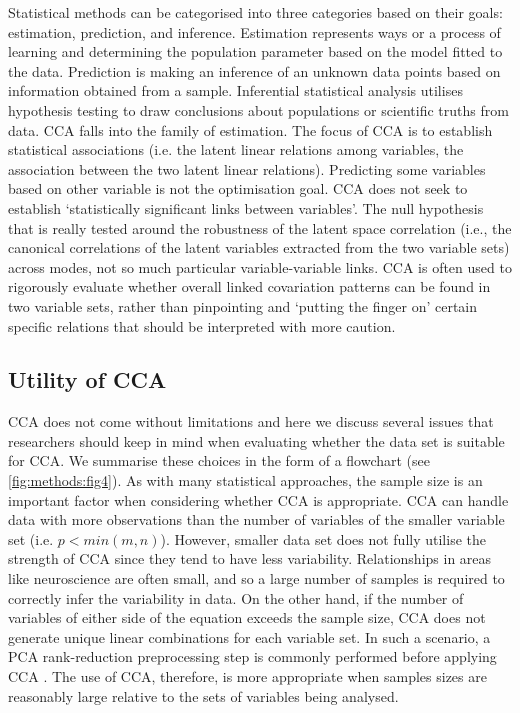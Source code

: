 Statistical methods can be categorised into three categories based on their goals: estimation, prediction, and inference.  Estimation represents ways or a process of learning and determining the population parameter based on the model fitted to the data. Prediction is making an inference of an unknown data points based on information obtained from a sample. Inferential statistical analysis utilises hypothesis testing to draw conclusions about populations or scientific truths from data. CCA falls into the family of estimation. The focus of CCA is to establish statistical associations (i.e. the latent linear relations among variables, the association between the two latent linear relations). Predicting some variables based on other variable is not the optimisation goal. CCA does not seek to establish `statistically significant links between variables'. The null hypothesis that is really tested around the robustness of the latent space correlation (i.e., the canonical correlations of the latent variables extracted from the two variable sets) across modes, not so much particular variable-variable links. CCA is often used to rigorously evaluate whether overall linked covariation patterns can be found in two variable sets, rather than pinpointing and `putting the finger on' certain specific relations that should be interpreted with more caution.


\subsection{Utility of CCA}
\label{ch:methods:limitations}

CCA does not come without limitations and here we discuss several issues that researchers should keep in mind when evaluating whether the data set is suitable for CCA. We summarise these choices in the form of a flowchart (see \cref{fig:methods:fig4}). As with many statistical approaches, the sample size is an important factor when considering whether CCA is appropriate. CCA can handle data with more observations than the number of variables of the smaller variable set (i.e. \(p< min(m,n)\)). However, smaller data set does not fully utilise the strength of CCA since they tend to have less variability. Relationships in areas like neuroscience are often small, and so a large number of samples is required to correctly infer the variability in data. On the other hand, if the number of variables of either side of the equation exceeds the sample size, CCA does not generate unique linear combinations for each variable set.  In such a scenario, a PCA rank-reduction preprocessing step is commonly performed before applying CCA \cite{Smith2015}. The use of CCA, therefore, is more appropriate when samples sizes are reasonably large relative to the sets of variables being analysed.

